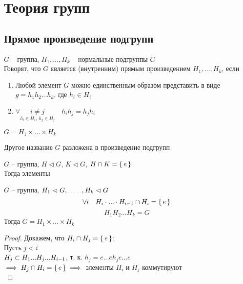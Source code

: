 \chapter{Теория групп}

\section{Прямое произведение подгрупп}

\begin{definition}
	$ G $ -- группа, $ H_1, ..., H_k $ -- нормальные подгруппы $ G $ \\
    Говорят, что $ G $ является (внутренним) прямым произведением $ H_1, ..., H_k $, если
    \begin{enumerate}
    	\item Любой элемент $ G $ можно единственным образом представить в виде $ g = h_1h_2...h_k $, где $ h_i \in H_i $
        \item $ \forall \underset{h_i \in H_i, ~ h_j \in H_j}{i \ne j} \quad h_ih_j = h_jh_i $
    \end{enumerate}
\end{definition}

\begin{notation}
	$ G = H_1 \times ... \times H_k $
\end{notation}

\begin{undefthm}{Другое название}
	$ G $ разложена в произведение подгрупп
\end{undefthm}

\begin{lemma}
    $ G $ -- группа, $ H \vartriangleleft G $, $ K \vartriangleleft G $, $ H \cap K = \set{e} $ \\
    Тогда элементы \widedots
\end{lemma}

\begin{theorem}
    $ G $ -- группа, $ H_1 \vartriangleleft G, \widedots[2em], H_k \vartriangleleft G $
    $$ \forall i \quad H_i \cdot ... \cdot H_{i - 1} \cap H_i = \set{e} $$
    $$ H_1H_2...H_k = G $$
    Тогда $ G = H_1 \times ... \times H_k $
\end{theorem}

\begin{proof}
    Докажем, что $ H_i \cap H_j = \set{e} $: \\
    Пусть $ j < i $ \\
    $ H_j \subset H_1...H_j...H_{i - 1} $, т. к. $ h_j = e...eh_je...e $ \\
    $ \implies H_j \cap H_i = \set{e} \implies $ элементы $ H_i $ и $ H_j $ коммутируют \\
    \widedots
\end{proof}

